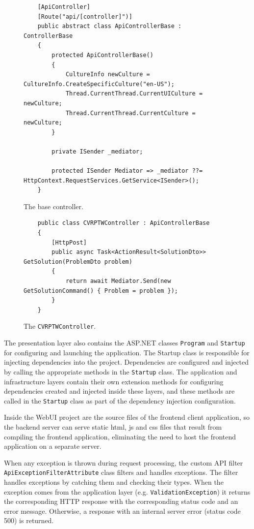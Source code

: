 \documentclass[a4paper,twoside,12pt]{book}
\begin{document}
\begin{figure}[H]
\centering
\begin{lstlisting}
    [ApiController]
    [Route("api/[controller]")]
    public abstract class ApiControllerBase : ControllerBase
    {
        protected ApiControllerBase()
        {
            CultureInfo newCulture = CultureInfo.CreateSpecificCulture("en-US");
            Thread.CurrentThread.CurrentUICulture = newCulture;
            Thread.CurrentThread.CurrentCulture = newCulture;
        }

        private ISender _mediator;

        protected ISender Mediator => _mediator ??= HttpContext.RequestServices.GetService<ISender>();
    }
\end{lstlisting}
\caption{The base controller.}
\label{fig:apiBase}
\end{figure}

\begin{figure} [H]
\centering
\begin{lstlisting}
    public class CVRPTWController : ApiControllerBase
    {
        [HttpPost]
        public async Task<ActionResult<SolutionDto>> GetSolution(ProblemDto problem)
        {
            return await Mediator.Send(new GetSolutionCommand() { Problem = problem });
        }
    }
\end{lstlisting}
\caption{The \lstinline{CVRPTWController}.}
\label{fig:controller}
\end{figure}

The presentation layer also contains the ASP.NET classes \lstinline{Program} and \lstinline{Startup} for configuring and launching the application. The {Startup} class is responsible for injecting dependencies into the project. Dependencies are configured and injected by calling the appropriate methods in the \lstinline{Startup} class. The application and infrastructure layers contain their own extension methods for configuring dependencies created and injected inside these layers, and these methods are called in the \lstinline{Startup} class as part of the dependency injection configuration.

Inside the WebUI project are the source files of the frontend client application, so the backend server can serve static html, js and css files that result from compiling the frontend application, eliminating the need to host the frontend application on a separate server.

When any exception is thrown during request processing, the custom API filter \lstinline{ApiExceptionFilterAttribute} class filters and handles exceptions. The filter handles exceptions by catching them and checking their types. When the exception comes from the application layer (e.g. \lstinline{ValidationException}) it returns the corresponding HTTP response with the corresponding status code and an error message. Otherwise, a response with an internal server error (status code 500) is returned. 
\end{document}
